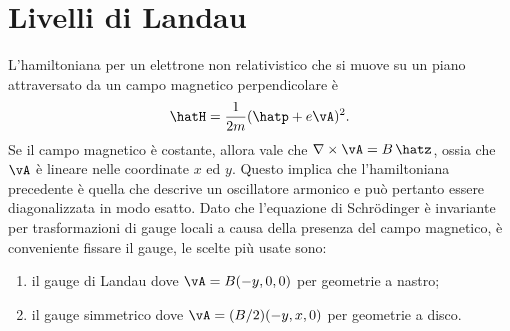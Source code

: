 \section{Livelli di Landau}
L'hamiltoniana per un elettrone non relativistico che si muove su un piano attraversato da un campo magnetico perpendicolare è
\begin{equation}
    \hatH = \frac{1}{2m}(\hatp + e\vA)^2.
\end{equation}
Se il campo magnetico è costante, allora vale che $\nabla \times \vA = B\,\hatz$, ossia che $\vA$ è lineare nelle coordinate $x$ ed $y$. Questo implica che l'hamiltoniana precedente è quella che descrive un oscillatore armonico e può pertanto essere diagonalizzata in modo esatto. Dato che l'equazione di Schr\"odinger è invariante per trasformazioni di gauge locali a causa della presenza del campo magnetico, è conveniente fissare il gauge, le scelte più usate sono:
\begin{enumerate}
    \item il gauge di Landau dove $\vA = B(-y,0,0)$ per geometrie a nastro;
    \item il gauge simmetrico dove $\vA = (B/2)(-y,x,0)$ per geometrie a disco.
\end{enumerate}

